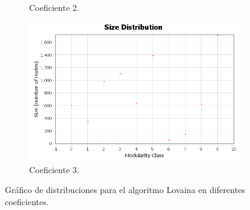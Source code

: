 \begin{figure}
\begin{subfigure}[t]{0.48\textwidth}
      \caption{Coeficiente 2.}
    \end{subfigure}
    \hfill
    \begin{subfigure}[t]{0.48\textwidth}
      \centering
      \includegraphics[width=\textwidth]{img/resultados/lovaina3/communities-size-distribution.png}
      \caption{Coeficiente 3.}
    \end{subfigure}
  
    \caption{Gráfico de distribuciones para el algoritmo Lovaina en diferentes coeficientes.}
\end{figure}


